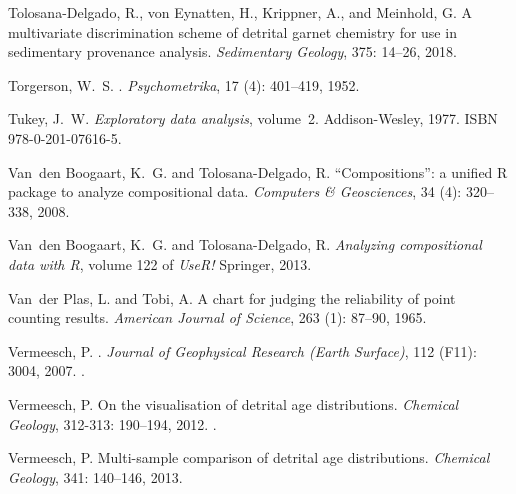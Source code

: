 \documentclass[11pt]{article}
\begin{document}
\begin{thebibliography}{68}
Tolosana-Delgado, R., von Eynatten, H., Krippner, A., and Meinhold, G.
\newblock A multivariate discrimination scheme of detrital garnet chemistry for
  use in sedimentary provenance analysis.
\newblock \emph{Sedimentary Geology}, 375: 14--26, 2018.

Torgerson, W.~S.
.
\newblock \emph{Psychometrika}, 17 (4): 401--419, 1952.

Tukey, J.~W.
\newblock \emph{Exploratory data analysis}, volume~2.
\newblock Addison-Wesley, 1977.
\newblock ISBN 978-0-201-07616-5.

Van~den Boogaart, K.~G. and Tolosana-Delgado, R.
\newblock ``{C}ompositions'': a unified {R} package to analyze compositional
  data.
\newblock \emph{Computers \& Geosciences}, 34 (4): 320--338,
  2008.

Van~den Boogaart, K.~G. and Tolosana-Delgado, R.
\newblock \emph{{Analyzing compositional data with R}}, volume 122 of
  \emph{UseR!}
\newblock Springer, 2013.

Van~der Plas, L. and Tobi, A.
\newblock A chart for judging the reliability of point counting results.
\newblock \emph{American Journal of Science}, 263 (1):
  87--90, 1965.

Vermeesch, P.
.
\newblock \emph{Journal of Geophysical Research (Earth Surface)}, 112
  (F11): 3004, 2007.
\newblock {}.

Vermeesch, P.
\newblock On the visualisation of detrital age distributions.
\newblock \emph{Chemical Geology}, 312-313: 190--194, 2012.
\newblock {}.

Vermeesch, P.
\newblock Multi-sample comparison of detrital age distributions.
\newblock \emph{Chemical Geology}, 341: 140--146, 2013.


\end{thebibliography}
\end{document}
